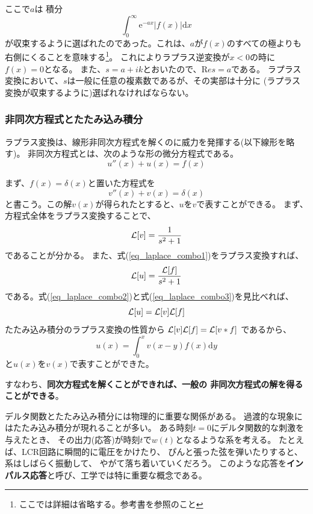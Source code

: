 \documentclass{jarticle}
\newcommand{\diff}{\mathrm d}
\newcommand{\e}{\mathrm e}
\begin{document}
ここで$a$は 積分
\begin{equation}
  \int_0^{\infty} \e^{-ax} |f(x)| \diff x
\end{equation}
が収束するように選ばれたのであった。これは、$a$が$f(x)$のすべての極よりも
右側にくることを意味する\footnote{ここでは詳細は省略する。参考書を参照のこと}。
これによりラプラス逆変換が$x<0$の時に$f(x)=0$となる。
また、$s = a + ik$とおいたので、${\mathrm Re} s = a$である。
ラプラス変換において、$s$は一般に任意の複素数であるが、その実部は十分に
(ラプラス変換が収束するように)選ばれなければならない。

\subsubsection{非同次方程式とたたみ込み積分}

ラプラス変換は、線形非同次方程式を解くのに威力を発揮する(以下線形を略す)。
非同次方程式とは、次のような形の微分方程式である。
\begin{equation}
  u''(x) + u(x) = f(x) \label{eq_laplace_combo1}
\end{equation}

まず、$f(x)=\delta(x)$と置いた方程式を
\begin{equation}
  v''(x) + v(x) = \delta(x)
\end{equation}
と書こう。この解$v(x)$が得られたとすると、$u$を$v$で表すことができる。
まず、方程式全体をラプラス変換することで、
\begin{equation}
  {\cal L}[v] = \frac{1}{s^2+1} \label{eq_laplace_combo2}
\end{equation}
であることが分かる。
また、式(\ref{eq_laplace_combo1})をラプラス変換すれば、
\begin{equation}
  {\cal L}[u] = \frac{{\cal L}[f]}{s^2+1}\label{eq_laplace_combo3}
\end{equation}
である。式(\ref{eq_laplace_combo2})と式(\ref{eq_laplace_combo3})を見比べれば、
\begin{equation}
  {\cal L}[u] = {\cal L}[v] {\cal L}[f]
\end{equation}
たたみ込み積分のラプラス変換の性質から
${\cal L}[v] {\cal L}[f] = {\cal L}[v*f]$
であるから、
\begin{equation}
  u(x) = \int_0^{x} v(x-y)f(x)  \diff y
\end{equation}
と$u(x)$を$v(x)$で表すことができた。

すなわち、{\bf 同次方程式を解くことができれば、一般の
非同次方程式の解を得ることができる}。

デルタ関数とたたみ込み積分には物理的に重要な関係がある。
過渡的な現象にはたたみ込み積分が現れることが多い。
ある時刻$t=0$にデルタ関数的な刺激を与えたとき、
その出力(応答)が時刻$t$で$w(t)$となるような系を考える。
たとえば、LCR回路に瞬間的に電圧をかけたり、
ぴんと張った弦を弾いたりすると、系はしばらく振動して、
やがて落ち着いていくだろう。
このような応答を{\bf インパルス応答}と呼び、工学では特に重要な概念である。
\end{document}

